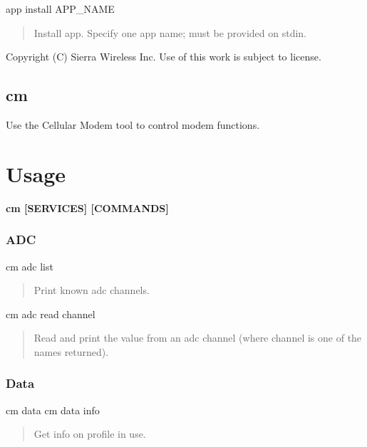 \begin{DoxyVerb}app install APP_NAME \end{DoxyVerb}
 \begin{quote}
Install app. Specify one app name; must be provided on {\ttfamily stdin}. \end{quote}






Copyright (C) Sierra Wireless Inc. Use of this work is subject to license. \hypertarget{toolsTarget_cm}{}\subsection{cm}\label{toolsTarget_cm}
Use the Cellular Modem tool to control modem functions.

\section*{Usage}

{\bfseries {\ttfamily  cm \mbox{[}S\+E\+R\+V\+I\+C\+E\+S\mbox{]} \mbox{[}C\+O\+M\+M\+A\+N\+D\+S\mbox{]} }}\hypertarget{tools_target_cm_toolsTarget_cm_adc}{}\subsubsection{A\+D\+C}\label{tools_target_cm_toolsTarget_cm_adc}
\begin{DoxyVerb}cm adc list \end{DoxyVerb}
 \begin{quote}
Print known {\ttfamily adc} channels. \end{quote}


\begin{DoxyVerb}cm adc read channel \end{DoxyVerb}
 \begin{quote}
Read and print the value from an adc channel (where {\ttfamily channel} is one of the names returned). \end{quote}
\hypertarget{tools_target_cm_toolsTarget_cm_data}{}\subsubsection{Data}\label{tools_target_cm_toolsTarget_cm_data}
\begin{DoxyVerb}cm data
cm data info \end{DoxyVerb}
 \begin{quote}
Get info on profile in use. \end{quote}


